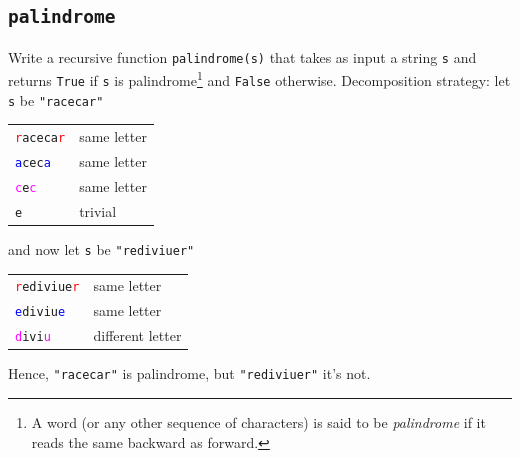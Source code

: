 \documentclass[t,handout,9pt]{beamer}
\newcommand{\cmark}{\ding{51}}%
\newcommand{\xmark}{\ding{55}}%
\begin{document}
\subsection{\texttt{palindrome}}
\begin{frame}
\vfill
Write a recursive function \texttt{palindrome(s)} that takes as input a string \texttt{s} and returns \texttt{True} if \texttt{s} is palindrome\footnote{A word (or any other sequence of characters) is said to be \textit{palindrome} if it reads the same backward as forward.} and \texttt{False} otherwise.
\vfill
Decomposition strategy: let \texttt{s} be \texttt{"racecar"}
\begin{table}[]
\begin{tabular}{ll}
\texttt{\textcolor{red}{r}aceca\textcolor{red}{r}} &  same letter \cmark \\
\texttt{\textcolor{blue}{a}cec\textcolor{blue}{a}} &  same letter \cmark \\
\texttt{\textcolor{magenta}{c}e\textcolor{magenta}{c}} &  same letter \cmark \\
\texttt{e} &  trivial \cmark \\
\end{tabular}
\end{table}
and now let \texttt{s} be \texttt{"rediviuer"}
\begin{table}[]
\begin{tabular}{ll}
\texttt{\textcolor{red}{r}ediviue\textcolor{red}{r}} &  same letter \cmark \\
\texttt{\textcolor{blue}{e}diviu\textcolor{blue}{e}} &  same letter \cmark \\
\texttt{\textcolor{magenta}{d}ivi\textcolor{magenta}{u}} &  different letter \xmark \\
\end{tabular}
\end{table}
Hence, \texttt{"racecar"} is palindrome, but \texttt{"rediviuer"} it's not.
\vfill
\end{frame}
%
\end{document}
